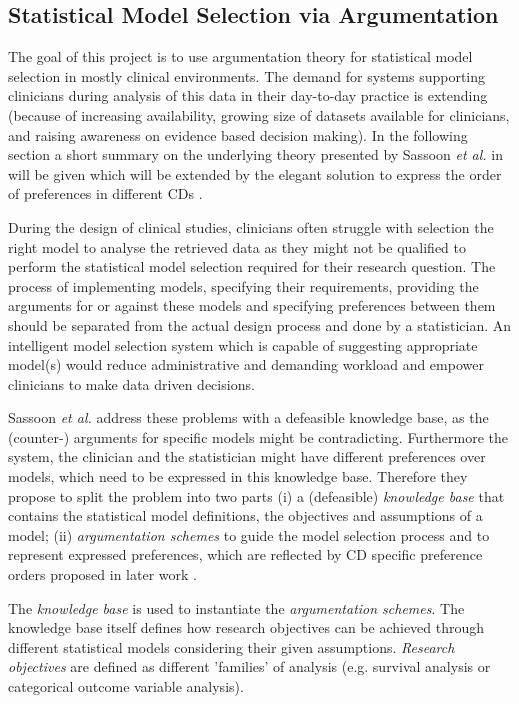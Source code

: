 \subsection{Statistical Model Selection via Argumentation}

\label{sub:statistical_model_selection}

The goal of this project is to use argumentation theory for statistical model selection in mostly clinical environments. The demand for systems supporting clinicians during analysis of this data in their day-to-day practice is extending (because of increasing availability, growing size of datasets available for clinicians, and raising awareness on evidence based decision making). In the following section a short summary on the underlying theory presented by Sassoon \textit{et al.} in \cite{sassoon2014} will be given which will be extended by the elegant solution to express the order of preferences in different \glspl{CD} \cite{sassoon2016,sassoon2016CD}.

During the design of clinical studies, clinicians often struggle with selection the right model to analyse the retrieved data as they might not be qualified to perform the statistical model selection required for their research question. The process of implementing models, specifying their requirements, providing the arguments for or against these models and specifying preferences between them should be separated from the actual design process and  done by a statistician. An intelligent model selection system which is capable of suggesting appropriate model(s) would reduce administrative and demanding workload and empower clinicians to make data driven decisions.

Sassoon \textit{et al.} \cite{sassoon2014} address these problems with a defeasible knowledge base, as the (counter-) arguments for specific models might be contradicting. Furthermore the system, the clinician and the statistician might have different preferences over models, which need to be expressed in this  knowledge base. Therefore they propose to split the problem into two parts (i) a (defeasible) \textit{knowledge base} that contains the statistical model definitions, the objectives and assumptions of a model; (ii) \textit{argumentation schemes} to guide the model selection process and to represent expressed preferences, which are reflected by \gls{CD} specific preference orders proposed in later work \cite{sassoon2016,sassoon2016CD} .

The \textit{knowledge base} is used to instantiate the \textit{argumentation schemes}. The knowledge base itself defines how research objectives can be achieved through different statistical models considering their given assumptions. \textit{Research objectives} are defined as different 'families' of analysis (e.g. survival analysis or categorical outcome variable analysis).


